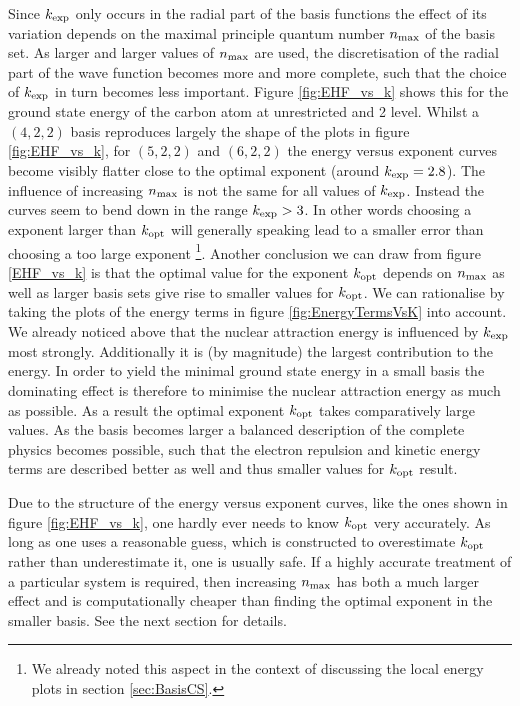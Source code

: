 Since $k_\text{exp}$ only occurs in the radial part of the \CS basis functions
the effect of its variation depends on the
maximal principle quantum number $n_\text{max}$ of the basis set.
As larger and larger values of $n_\text{max}$ are used,
the discretisation of the radial part of the wave function
becomes more and more complete,
such that the choice of $k_\text{exp}$ in turn becomes less important.
Figure \vref{fig:EHF_vs_k} shows this for the ground state energy of the carbon atom
at unrestricted \HF and {\MP}2 level.
Whilst a $(4,2,2)$ \CS basis reproduces largely the
shape of the plots in figure \ref{fig:EHF_vs_k},
for $(5,2,2)$ and $(6,2,2)$ the energy versus exponent curves
become visibly flatter close to the optimal exponent (around $k_\text{exp} = 2.8$).
The influence of increasing $n_\text{max}$ is not the same
for all values of $k_\text{exp}$.
Instead the curves seem to bend down in the range $k_\text{exp} > 3$.
In other words choosing a \CS exponent larger than $k_\text{opt}$
will generally speaking lead to a smaller error
than choosing a too large exponent%
\footnote{We already noted this aspect in the context of discussing
	the local energy plots in section \vref{sec:BasisCS}.}.
Another conclusion we can draw from figure \ref{EHF_vs_k}
is that the optimal value for the exponent $k_\text{opt}$
depends on $n_\text{max}$ as well
as larger basis sets give rise to smaller values for $k_\text{opt}$.
We can rationalise by taking the plots of the energy terms
in figure \vref{fig:EnergyTermsVsK} into account.
We already noticed above that the nuclear attraction energy
is influenced by $k_\text{exp}$ most strongly.
Additionally it is (by magnitude) the largest contribution to the \HF energy.
In order to yield the minimal ground state energy
in a small basis the dominating effect is therefore to
minimise the nuclear attraction energy as much as possible.
As a result the optimal exponent $k_\text{opt}$ takes comparatively large values.
As the basis becomes larger a balanced description
of the complete physics becomes possible,
such that the electron repulsion and kinetic energy terms
are described better as well
and thus smaller values for $k_\text{opt}$ result.

Due to the structure of the energy versus exponent curves,
like the ones shown in figure \vref{fig:EHF_vs_k},
one hardly ever needs to know $k_\text{opt}$ very accurately.
As long as one uses a reasonable guess,
which is constructed to overestimate $k_\text{opt}$
rather than underestimate it, one is usually safe.
If a highly accurate treatment of a particular system is required,
then increasing $n_\text{max}$ has both a much larger effect
and is computationally cheaper than finding the optimal exponent in the smaller basis.
See the next section for details.

